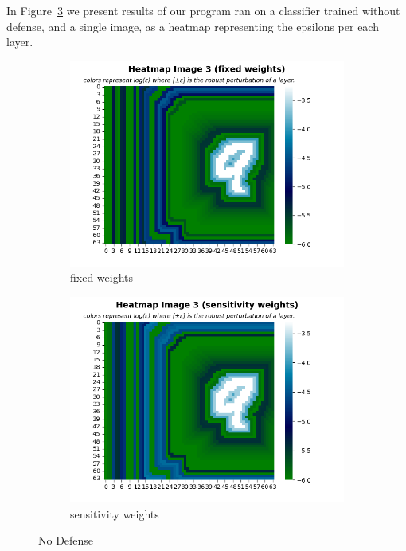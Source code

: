   In Figure~\ref{fig:No defense} we present results of our program ran on a classifier trained without defense, and a single image, as a heatmap representing the epsilons per each layer.
    \begin{figure}
         \centering
         \begin{subfigure}[b]{0.4\textwidth}
             \centering
             \includegraphics[width=\textwidth]{no_defense_fixed_weights.png}
             \caption{fixed weights}
             \label{sub-fig:No defense FW}
         \end{subfigure}
         \hfill
         \begin{subfigure}[b]{0.4\textwidth}
             \centering
             \includegraphics[width=\textwidth]{no_defense_sensitivity_weights.png}
             \caption{sensitivity weights}
             \label{sub-fig:No defense SW}
         \end{subfigure}
         \caption{No Defense}
         \label{fig:No defense}
     \end{figure}
